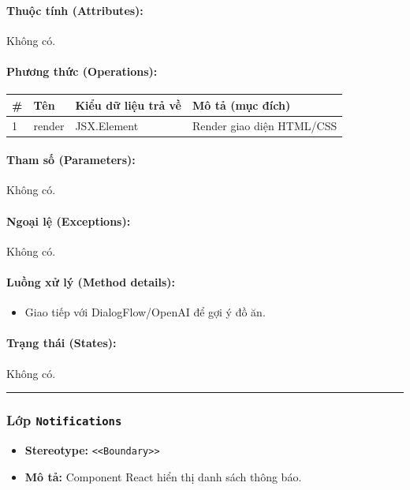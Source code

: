 \documentclass[12pt,a4paper]{article}
\begin{document}
\paragraph{Thuộc tính (Attributes):}
Không có.

\paragraph{Phương thức (Operations):}
\begin{longtable}{|p{0.6cm}|p{5.0cm}|p{2.8cm}|p{5.4cm}|}
\hline
\textbf{\#} & \textbf{Tên} & \textbf{Kiểu dữ liệu trả về} & \textbf{Mô tả (mục đích)} \\ \hline
\endhead
1 & render & JSX.Element & Render giao diện HTML/CSS \\ \hline
\end{longtable}

\paragraph{Tham số (Parameters):}
Không có.

\paragraph{Ngoại lệ (Exceptions):}
Không có.

\paragraph{Luồng xử lý (Method details):}
\begin{itemize}[leftmargin=*]
    \item Giao tiếp với DialogFlow/OpenAI để gợi ý đồ ăn.
\end{itemize}


\paragraph{Trạng thái (States):}
Không có.

\vskip 0.5cm
\noindent\rule{\textwidth}{0.5pt}
\vskip 0.5cm

\subsubsection{Lớp \texttt{Notifications}}

\begin{itemize}[leftmargin=*]
    \item \textbf{Stereotype:} \texttt{\textless{}\textless{}Boundary\textgreater{}\textgreater{}}
    \item \textbf{Mô tả:} Component React hiển thị danh sách thông báo.
\end{itemize}
\end{document}
